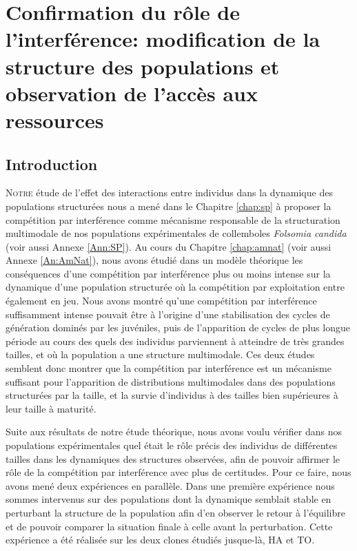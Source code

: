 \chapter{Confirmation du rôle de l'interférence: modification de la structure
des populations et observation de l'accès aux ressources}
\label{chap:sm}

\vspace{5cm}

\section{Introduction}

\lettrine[lines=3]{N}{otre} étude de l'effet des interactions entre individus
dans la dynamique des populations structurées nous a mené dans le Chapitre
\ref{chap:sp} à proposer la
compétition par interférence comme mécanisme responsable de la structuration
multimodale de nos populations expérimentales de collemboles \textit{Folsomia
candida} (voir aussi Annexe \ref{Ann:SP}). Au cours du Chapitre
\ref{chap:amnat} (voir aussi Annexe \ref{An:AmNat}), nous avons étudié dans un
modèle théorique les conséquences d'une compétition par interférence plus ou moins intense sur la dynamique d'une population structurée où la compétition par
exploitation entre également en jeu. Nous avons montré qu'une compétition par
interférence suffisamment intense pouvait être à l'origine d'une stabilisation
des cycles de génération dominés par les juvéniles, puis de l'apparition de
cycles de plus longue période au cours des quels des individus parviennent à
atteindre de très grandes tailles, et où la population a une structure
multimodale. Ces deux études semblent donc montrer que la compétition par
interférence est un mécanisme suffisant pour l'apparition de distributions
multimodales dans des populations structurées par la taille, et la survie
d'individus à des tailles bien supérieures à leur taille à maturité.

Suite aux résultats de notre étude théorique, nous avons voulu vérifier dans nos
populations expérimentales quel était le rôle précis des individus de
différentes tailles dans les dynamiques des structures observées, afin de
pouvoir affirmer le rôle de la compétition par interférence avec plus de certitudes.
Pour ce faire, nous avons mené deux expériences en parallèle. Dans une première
expérience nous sommes intervenus sur des populations dont la dynamique semblait
stable en perturbant la structure de la population afin d'en observer le retour
à l'équilibre et de pouvoir comparer la situation finale à celle avant la
perturbation. Cette expérience a été réalisée sur les deux clones étudiés
jusque-là, HA et TO.

